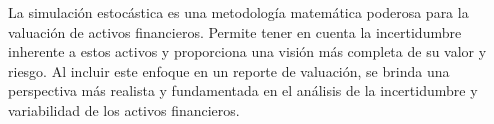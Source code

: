La simulación estocástica es una metodología matemática poderosa para la valuación de activos financieros. Permite tener en cuenta la incertidumbre inherente a estos activos y proporciona una visión más completa de su valor y riesgo. Al incluir este enfoque en un reporte de valuación, se brinda una perspectiva más realista y fundamentada en el análisis de la incertidumbre y variabilidad de los activos financieros.\\

